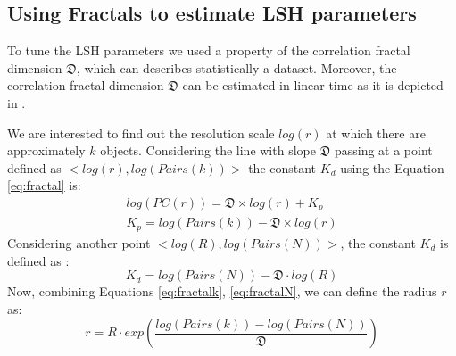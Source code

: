 \documentclass{article}
\begin{document}



\subsection{Using Fractals to estimate LSH parameters}
         
 
To tune the LSH parameters we used  a property of the   correlation fractal dimension $\mathfrak{D}$, which can  describes statistically a dataset.  Moreover, the correlation fractal dimension $\mathfrak{D}$ can be estimated in linear time as it is depicted in \cite{traina2010fast}. 

We are interested to find out  the resolution scale $log(r)$ at which there are approximately $k$ objects.  Considering the line with slope $\mathfrak{D}$ passing at  a point defined as $  <log (r), log (Pairs(k))>$  the   constant $K_d$ using the Equation \ref{eq:fractal} is:
\begin{eqnarray}\label{eq:fractalk}
       log(PC(r)) = \mathfrak{D} \times log (r) + K_p \nonumber\\
       K_p   = log (Pairs (k)) - \mathfrak{D} \times log (r)
\end{eqnarray} 
Considering  another point   $  <log (R), log (Pairs(N))>$, the   constant $K_d$  is defined as :
\begin{equation}\label{eq:fractalN}
    K_d    = log (Pairs(N)) - \mathfrak{D} \cdot log (R) 
\end{equation} 
Now, combining Equations \ref{eq:fractalk}, \ref{eq:fractalN}, we can define  the radius  $r$ as:       
\begin{equation}\label{eq:fractalR}
  r  =  R \cdot  exp (  \frac{log (Pairs (k)) - log (Pairs(N))}{ \mathfrak{D} } )    
\end{equation}
\end{document}
